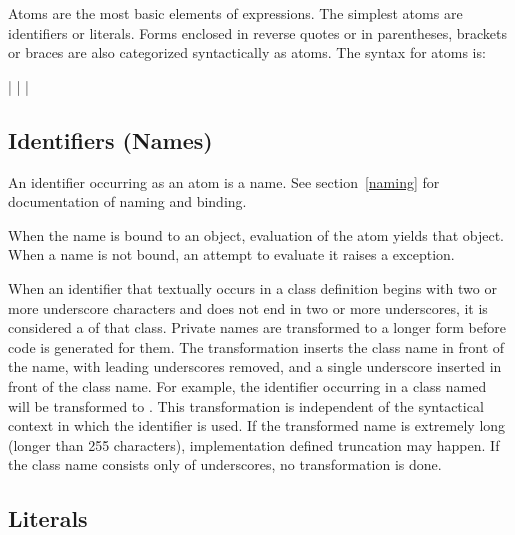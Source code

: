 Atoms are the most basic elements of expressions.  The simplest atoms
are identifiers or literals.  Forms enclosed in
reverse quotes or in parentheses, brackets or braces are also
categorized syntactically as atoms.  The syntax for atoms is:

\begin{productionlist}
             { |  | }
             { | }
\end{productionlist}


\subsection{Identifiers (Names)\label{atom-identifiers}}

An identifier occurring as an atom is a name.  See
section~\ref{naming} for documentation of naming and binding.

When the name is bound to an object, evaluation of the atom yields
that object.  When a name is not bound, an attempt to evaluate it
raises a  exception.

%
%
When an identifier that textually occurs in a class definition begins
with two or more underscore characters and does not end in two or more
underscores, it is considered a  of that class.
Private names are transformed to a longer form before code is
generated for them.  The transformation inserts the class name in
front of the name, with leading underscores removed, and a single
underscore inserted in front of the class name.  For example, the
identifier  occurring in a class named  will be
transformed to .  This transformation is independent
of the syntactical context in which the identifier is used.  If the
transformed name is extremely long (longer than 255 characters),
implementation defined truncation may happen.  If the class name
consists only of underscores, no transformation is done.


\subsection{Literals\label{atom-literals}}

